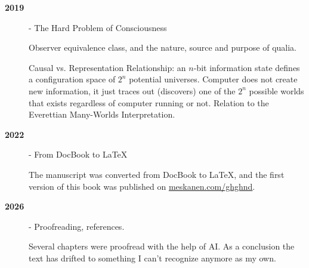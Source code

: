 \begin{description}
\item[\textbf{2019}] -  The Hard Problem of Consciousness

  Observer equivalence class, and the nature, source and purpose of qualia. 

  Causal vs. Representation Relationship: an $n$-bit information state defines a configuration space of $2^n$ potential universes. 
  Computer does not create new information, it just traces out (discovers) one of the $2^n$ possible worlds that exists regardless of computer running or not.
  Relation to the Everettian Many-Worlds Interpretation. 


\item[\textbf{2022}] - From DocBook to LaTeX

  The manuscript was converted from DocBook to LaTeX, and the first version of this book was published on \href{https://meskanen.com/ghghnd/}{meskanen.com/ghghnd}.

\item[\textbf{2026}] - Proofreading, references.

Several chapters were proofread with the help of AI. 
As a conclusion the text has drifted to something I can't recognize anymore as my own.




\end{description}


\newpage
